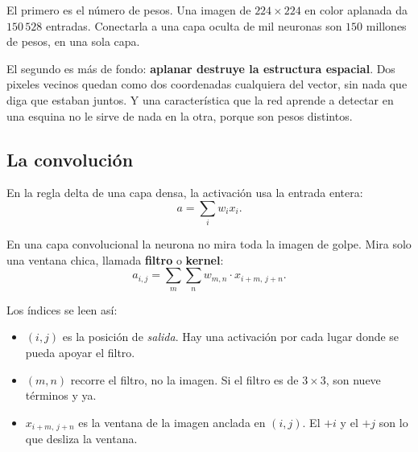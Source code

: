 \documentclass[11pt,letterpaper]{article}
\begin{document}
El primero es el número de pesos. Una imagen de $224 \times 224$ en
color aplanada da $150\,528$ entradas. Conectarla a una capa oculta de
mil neuronas son $150$ millones de pesos, en una sola capa.

El segundo es más de fondo: \textbf{aplanar destruye la estructura
espacial}. Dos pixeles vecinos quedan como dos coordenadas cualquiera
del vector, sin nada que diga que estaban juntos. Y una característica
que la red aprende a detectar en una esquina no le sirve de nada en la
otra, porque son pesos distintos.

\subsection*{La convolución}

En la regla delta de una capa densa, la activación usa la entrada
entera:
\[
    a = \sum_i w_i x_i .
\]

En una capa convolucional la neurona no mira toda la imagen de golpe.
Mira solo una ventana chica, llamada \textbf{filtro} o \textbf{kernel}:
\[
    a_{i,j} = \sum_m \sum_n w_{m,n} \cdot x_{i+m,\, j+n} .
\]

Los índices se leen así:

\begin{itemize}[itemsep=0.25em]
  \item $(i,j)$ es la posición de \emph{salida}. Hay una activación
        por cada lugar donde se pueda apoyar el filtro.
  \item $(m,n)$ recorre el filtro, no la imagen. Si el filtro es de
        $3 \times 3$, son nueve términos y ya.
  \item $x_{i+m,\,j+n}$ es la ventana de la imagen anclada en $(i,j)$.
        El $+i$ y el $+j$ son lo que desliza la ventana.
\end{itemize}
\end{document}
